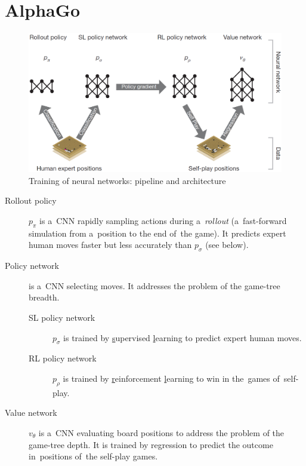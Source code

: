 \documentclass[a4paper,10pt]{article}
\begin{document}
\section{AlphaGo}
\begin{figure}[H]
  \centering
  \includegraphics[width=.7\textwidth]{../img/neural_nets_pipeline.png}
  \caption{Training of neural networks: pipeline and architecture}
  \label{fig:neural_nets_pipeline}
\end{figure}

\begin{description}
  \item [Rollout policy] $p_\pi$ is a~CNN rapidly sampling actions during a~\emph{rollout} (a~fast-forward simulation from a~position to the end of~the game).
    It predicts expert human moves faster but less accurately than $p_\sigma$ (see below).

  \item [Policy network] is a~CNN selecting moves.
    It addresses the problem of the game-tree breadth.
    \begin{description}
      \item [SL policy network] $p_\sigma$ is trained by \underline{s}upervised \underline{l}earning to predict expert human moves.
        \item [RL policy network] $p_\rho$ is trained by \underline{r}einforcement \underline{l}earning to win in the~games of~self-play.
    \end{description}

  \item [Value network] $v_\theta$ is a~CNN evaluating board positions to address the problem of the game-tree depth.
    It is trained by regression to predict the outcome in~positions of~the self-play games.
\end{description}
\end{document}
